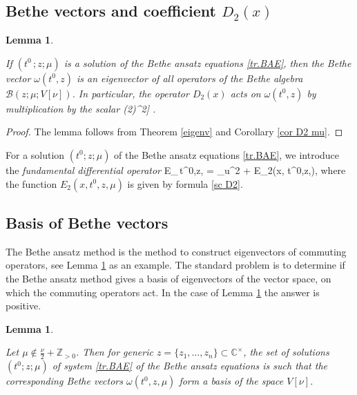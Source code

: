 \documentclass[12pt]{amsart}
\newtheorem{lem}[thm]{Lemma}
\numberwithin{equation}{section}
\theoremstyle{definition}
\let\mc\mathcal
\let\om\omega
\let\der\partial
\def\C{{\mathbb C}}
\def\Z{{\mathbb Z}}
\def\B{{\mc B}}
\begin{document}
\subsection{Bethe vectors and coefficient $D_2(x)$}

\begin{lem}
\label{hatB2 lem}

If $(t^0\!\,; z; \mu)$ is a solution of the Bethe ansatz equations 
\eqref{tr.BAE}, then the Bethe vector $\om(t^0\!,z)$ is an eigenvector of
all operators of the Bethe algebra $\B(z;\mu; V[\nu])$. In particular, the 
operator $D_2(x)$ acts on $\om(t^0\!,z)$ by multiplication by the scalar
\bean
\label{sc D2}
\phantom{aaaa}
(2\pi {})^2\Big[- \frac{(\mu+\nu/2)^2}{4} + \sum_{s=1}^n \Big[ \frac{m_s(m_s+2)/4 + k_s (t^0\!, z,\mu)}{1-x/z_s}
 - \frac{m_s(m_s+2)/4}{(1-x/z_s)^2} \Big]\Big] .
\eean

\end{lem}



\begin{proof}
The lemma follows from Theorem \ref{eigenv} and Corollary \ref{cor D2 mu}.
\end{proof}

For  a  solution  $(t^0\!; z; \mu)$  of the Bethe ansatz equations 
\eqref{tr.BAE}, we introduce the {\it fundamental differential operator}
\bean
\label{hatD}
\mc E_{\,t^0\!,z,\mu} = \der_u^2 + E_2(x, t^0\!,z,\mu),
\eean
where the function $E_2(x, t^0\!,z,\mu)$ is given by formula \eqref{sc D2}.


\subsection{Basis of Bethe vectors}

The Bethe ansatz method is the method to construct eigenvectors of commuting operators,
see Lemma  \ref{hatB2 lem} as an example. The standard problem 
is to determine if  the Bethe ansatz method gives a basis of eigenvectors  of the vector
space, on which the commuting operators act.
In the case of Lemma  \ref{hatB2 lem} the answer is positive.




\begin{lem} 
\label{basis}

Let $\mu\notin \frac\nu 2+\Z_{>0}$.  Then for generic $z=\{z_1,\dots,z_n\}\subset \C^\times$,
the set of solutions $(t^0;z;\mu)$ 
 of   system \eqref{tr.BAE}
of the Bethe ansatz equations
 is such that
 the corresponding Bethe vectors $\om(t^0\!,z,\mu)$ form a basis of the space $V[\nu]$.

\end{lem}
\end{document}
